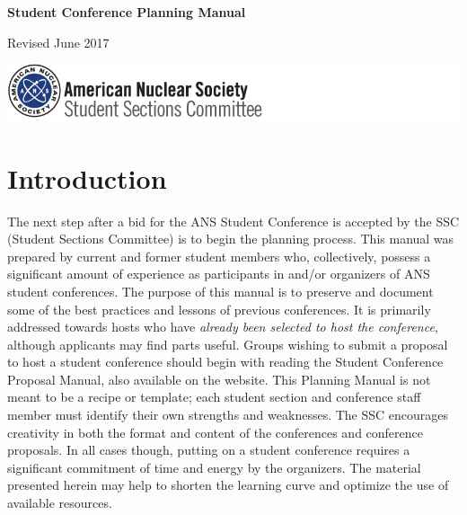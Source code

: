 \documentclass[12pt]{article}
\begin{document}
\begin{titlepage}
\vspace*{2cm}
\centering
{\Huge\bfseries Student Conference Planning Manual\par}

\vspace{2cm}
\rm{\Large Revised June 2017\par }

\vfill
\includegraphics[scale=0.75]{SSClogo.png}
\end{titlepage}

{\hypersetup{linkcolor=black}
\tableofcontents
}

\clearpage

\section{Introduction}

The next step after a bid for the ANS Student Conference is accepted by the SSC (Student Sections Committee) is to begin the planning process.
This manual was prepared by current and former student members who, collectively, possess a significant amount of experience as participants in and/or organizers of ANS student conferences.
The purpose of this manual is to preserve and document some of the best practices and lessons of previous conferences.
It is primarily addressed towards hosts who have \emph{already been selected to host the conference}, although applicants may find parts useful.
Groups wishing to submit a proposal to host a student conference should begin with reading the Student Conference Proposal Manual, also available on the website.
This Planning Manual is not meant to be a recipe or template; each student section and conference staff member must identify their own strengths and weaknesses.
The SSC encourages creativity in both the format and content of the conferences and conference proposals.
In all cases though, putting on a student conference requires a significant commitment of time and energy by the organizers.
The material presented herein may help to shorten the learning curve and optimize the use of available resources.
\end{document}
